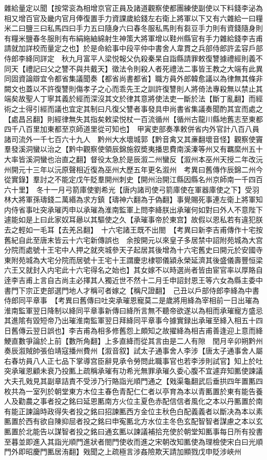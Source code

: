 雜給量定以聞【按常衮為相增京官正員及諸道觀察使都團練使副使以下料錢李泌為相又增百官及畿内官月俸復置手力資課歲給錢左右衛上將軍以下又有六雜給一曰糧米二曰鹽三曰私馬四曰手力五曰隨身六曰春冬服私馬則有芻豆手力則有資錢隨身則有糧米鹽春冬服則有布絹絁紬綿射生神策大將軍增以鞋州縣官有手力雜給錢李吉甫請就加詳校而量定之也】於是命給事中段平仲中書舍人韋貫之兵部侍郎許孟容戶部侍郎李絳同詳定　秋九月富平人梁悦報父仇殺秦杲自詣縣請罪敕復讐據禮經則義不同天【禮記曰父之讐不與共戴天】徵法令則殺人者死禮法二事皆王教之大端有此異同固資論辯宜令都省集議聞奏【都省尚書都省】職方員外郎韓愈議以為律無其條非闕文也蓋以不許復讐則傷孝子之心而乖先王之訓許復讐則人將倚法專殺無以禁止其端矣故聖人丁寧其義於經而深沒其文於律其意將使法吏一斷於法【斷丁亂翻】而經術之士得引經而議也宜定其制曰凡復父讐者事發具申尚書省集議奏聞酌其宜而處之【處昌呂翻】則經律無失其指矣敕梁悦杖一百流循州【循州古龍川縣地舊志至東都四千八百里加東都至京師道里從可知也】　甲寅吏部奏凖敕併省内外官計八百八員諸司流外一千七百六十九人　黔州大水壞城郭【黔音禽又其亷翻壞音怪】觀察使竇羣發溪洞蠻以治之【黔中觀察使領辰錦施叙奬夷播思費南溪溱等州又有羈縻州五十大率皆溪洞蠻也治直之翻】督役太急於是辰溆二州蠻反【溆州本巫州天授二年改沅州開元十三年以沅原聲相近復為巫州大歷五年更名溆州　考異曰舊傳作辰錦二州今從實錄】羣討之不能定戊午貶羣開州刺史【開州治開江縣因縣名州京師南一千四百六十里】　冬十一月弓箭庫使劉希光【唐内諸司使弓箭庫使在軍器庫使之下】受羽林大將軍孫璹錢二萬緡為求方鎮【璹神六翻為于偽翻】事覺賜死事連左衛上將軍知内侍省事吐突承璀丙申以承璀為淮南監軍上問李絳朕出承璀何如對曰外人不意陛下遽能如是上曰此家奴耳曏以其驅使之久【承璀事帝於東宫】故假以恩私若有違犯朕去之輕如一毛耳【去羌呂翻】　十六宅諸王既不出閤　【考異曰新李吉甫傳作十宅按舊紀自此至唐末皆云十六宅新傳誤也　余按開元以來皇子多居禁中詔附苑城為大宫分院而處號十王宅中人押之就夾城參天子起居其後增為十六宅舊史曰開元於安國寺東附苑城為大宅分院而居號十王宅十王謂慶忠棣鄂儀潁永榮延濟其後盛儀壽豐恒梁六王又就封入内宅此十六宅得名之始也】其女嫁不以時選尚者皆由宦官率以厚賂自逹李吉甫上言自古尚主必擇其人獨近世不然十二月壬申詔封恩王等六女為縣主委中書門下宗正吏部選門地人才稱可者嫁之【稱尺證翻】　己丑以戶部侍郎李絳為中書侍郎同平章事　【考異曰舊傳曰吐突承璀恩寵莫二是歲將用絳為宰相前一日出璀為淮南監軍翌日降制以絳同平章事新傳曰絳所言無不聽帝欲遂以為相而承璀寵方盛忌其進隂有毀短帝乃出璀淮南監軍翌日拜絳同平章事今據實録出承璀至絳入相五十四日舊傳云翌日誤也】李吉甫為相多修舊怨上頗知之故擢絳為相吉甫善逢迎上意而絳鯁直數爭論於上前【數所角翻】上多直絳而從其言由是二人有隙　閏月辛卯朔黔州奏辰溆賊帥張伯靖寇播州費州【溆音叙】試太子通事舍人李涉【唐太子通事舍人屬右春坊員八人正七品下掌導宫臣辭見承令勞問此職事官也若李涉則試官】知上於吐突承璀恩顧未衰乃投匭上疏稱承璀有功希光無罪承璀久委心腹不宜遽弃知匭使諫議大夫孔戣見其副章詰責不受涉乃行賂詣光順門通之【戣渠龜翻武后垂拱四年置匭四枚共為一室列於朝堂東方木位主春色青配仁仁者以亭育為本以青匭置於東有能告養人及勸農之事者投之銘曰延恩匭南方火位主夏色赤配信信者風化之本以丹匭置於南有能正諫論時政得失者投之銘曰招諫匭西方金位主秋色白配義義者以斷决為本以素匭置於西有欲自陳抑屈者投之銘曰申寃匭北方水位主冬色玄配智智者謀慮之本以玄匭置於北能告以謀智者投之銘曰通玄匭以諫議補拾充使於朝堂知匭事每日所有投書至暮並即進入其詣光順門進狀者閤門使收而進之宋朝改知匭使為理檢使宋白曰光順門外即昭慶門匭居洧翻】戣聞之上疏極言涉姦險欺天請加顯戮戊申貶涉峽州